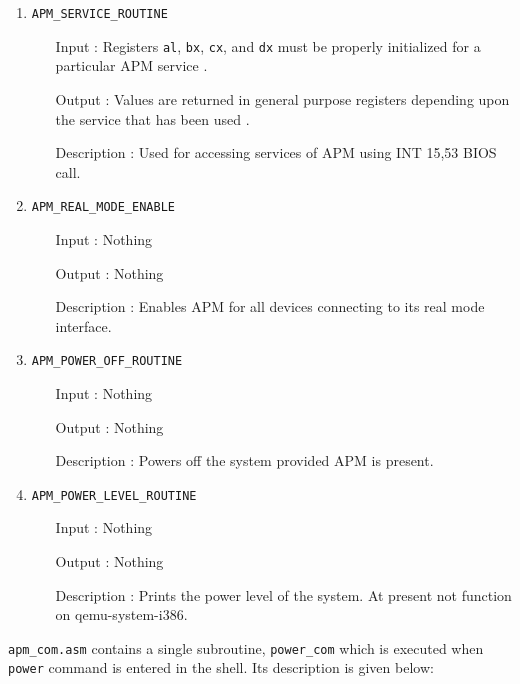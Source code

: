 \begin{enumerate}
  \item \texttt{APM\_SERVICE\_ROUTINE}
  		\begin{enumerate}[align=parleft, labelsep=2cm, leftmargin=1.06in]
  		  \item[Input]: Registers \texttt{al}, \texttt{bx}, \texttt{cx}, and \texttt{dx} must be properly initialized for a particular APM service \cite{apm199612}.
  		  \item[Output]: Values are returned in general purpose registers depending upon the service that has been used \cite{apm199612}.
  		  \item[Description]: Used for accessing services of APM using INT 15,53 BIOS call.
  		\end{enumerate}
  \item \texttt{APM\_REAL\_MODE\_ENABLE}
  		\begin{enumerate}[align=parleft, labelsep=2cm, leftmargin=1.06in]
  		  \item[Input]: Nothing
  		  \item[Output]: Nothing
  		  \item[Description]: Enables APM for all devices connecting to its real mode interface.
  		\end{enumerate}
  \item \texttt{APM\_POWER\_OFF\_ROUTINE}
  		\begin{enumerate}[align=parleft, labelsep=2cm, leftmargin=1.06in]
  		  \item[Input]: Nothing
  		  \item[Output]: Nothing
  		  \item[Description]: Powers off the system provided APM is present.
  		\end{enumerate}
  \item \texttt{APM\_POWER\_LEVEL\_ROUTINE}
  		\begin{enumerate}[align=parleft, labelsep=2cm, leftmargin=1.06in]
  		  \item[Input]: Nothing
  		  \item[Output]: Nothing
  		  \item[Description]: Prints the power level of the system. At present not function on qemu-system-i386.
  		\end{enumerate}
\end{enumerate}
\texttt{apm\_com.asm} contains a single subroutine, \texttt{power\_com} which is executed when \texttt{power} command is entered in the shell. Its description is given below:

